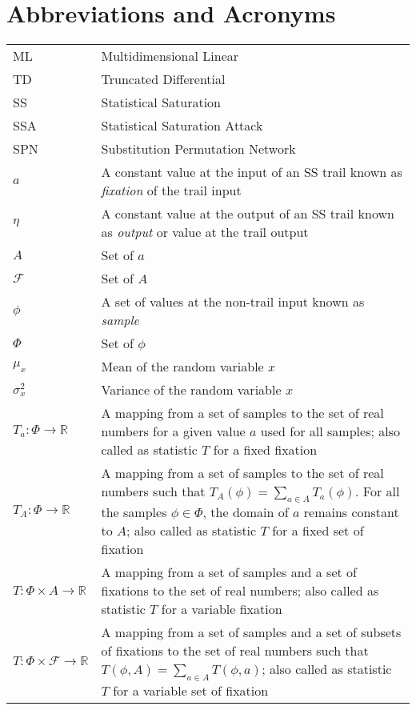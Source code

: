 \chapter*{Abbreviations and Acronyms}


\noindent
\begin{longtable}{@{}p{}p{}@{}}
ML & Multidimensional Linear\\
TD & Truncated Differential\\
SS & Statistical Saturation\\
SSA & Statistical Saturation Attack\\
SPN & Substitution Permutation Network\\
$a$ & A constant value at the input of an SS trail known as \textit{fixation} of the trail input \\
$\eta$ & A constant value at the output of an SS trail known as \textit{output} or value at the trail output\\
$A$ & Set of $a$\\
$\mathcal{F}$ & Set of $A$ \\
$\phi$ & A set of values at the non-trail input known as \textit{sample} \\
$\Phi$ & Set of $\phi$\\
$\mu_x$ & Mean of the random variable $x$ \\
$\sigma^2_x$ & Variance of the random variable $x$ \\
$T_a:\Phi \rightarrow \mathbb{R}$ & A mapping from a set of samples to the set of real numbers for a given value $a$ used for all samples; also called as statistic $T$ for a fixed fixation\\
$T_A:\Phi \rightarrow \mathbb{R}$ & A mapping from a set of samples to the set of real numbers such that $T_{A}\left(\phi\right) = \displaystyle\sum_{a \in A} T_{a}(\phi)$. For all the samples $\phi \in \Phi$, the domain of $a$ remains constant to $A$; also called as statistic $T$ for a fixed set of fixation\\
$T:\Phi \times A \rightarrow \mathbb{R}$ & A mapping from a set of samples and a set of fixations to the set of real numbers; also called as statistic $T$ for a variable fixation\\
$T:\Phi \times \mathcal{F} \rightarrow \mathbb{R}$& A mapping from a set of samples and a set of subsets of fixations to the set of real numbers such that $T\left(\phi,A\right) = \displaystyle\sum_{a \in A} T(\phi,a)$; also called as statistic $T$ for a variable set of fixation
\end{longtable}
